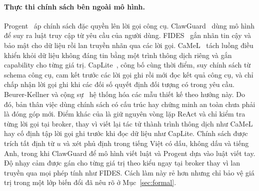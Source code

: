 \paragraph{Thực thi chính sách bên ngoài mô hình.} Progent~\cite{shi2025progent} áp chính sách đặc quyền lên lời gọi
công cụ. ClawGuard~\cite{zhao2026clawguard} dùng mô hình để suy ra luật truy cập từ yêu cầu của người dùng.
FIDES~\cite{costa2025fides} gắn nhãn tin cậy và bảo mật cho dữ liệu rồi lan truyền nhãn qua các lời gọi.
CaMeL~\cite{debenedetti2026camel} tách luồng điều khiển khỏi dữ liệu không đáng tin bằng một trình thông dịch riêng và
gắn capability cho từng giá trị. CapLite~\cite{xu2026caplite}, công bố cùng thời điểm, suy chính sách từ schema công cụ,
cam kết trước các lời gọi ghi rồi mới đọc kết quả công cụ, và chỉ chấp nhận lời gọi ghi khi các đối số quyết định đối
tượng có trong yêu cầu. Beurer-Kellner và cộng sự~\cite{beurerkellner2025patterns} hệ thống hóa các mẫu thiết kế theo
hướng này. Do đó, bản thân việc dùng chính sách có cấu trúc hay chứng minh an toàn chưa phải là đóng góp mới. Điểm khác
của \ours{} là giữ nguyên vòng lặp ReAct và chỉ kiểm tra từng lời gọi tại broker, thay vì viết lại tác tử thành trình
thông dịch như CaMeL hay cố định tập lời gọi ghi trước khi đọc dữ liệu như CapLite. Chính sách được trích tất định từ $u$
và xét phủ định trong tiếng Việt có dấu, không dấu và tiếng Anh, trong khi ClawGuard để mô hình viết luật và Progent dựa
vào luật viết tay. Độ nhạy cảm được gán cho từng giá trị theo kiểu ngay tại broker thay vì lan truyền qua mọi phép tính
như FIDES. Cách làm này rẻ hơn nhưng chỉ bảo vệ giá trị trong một lớp biến đổi đã nêu rõ ở Mục~\ref{sec:formal}.
